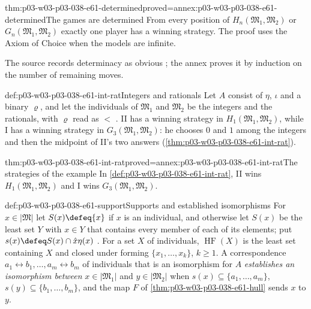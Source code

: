\begin{hblemma}{thm:p03-w03-p03-038-e61-determined}{proved=annex:p03-w03-p03-038-e61-determined}{The games are determined}
From every position of \(H_n(\mathfrak M_1,\mathfrak M_2)\) or
\(G_n(\mathfrak M_1,\mathfrak M_2)\) exactly one player has a winning
strategy. The proof uses the Axiom of Choice when the models are infinite.
\end{hblemma}

The source records determinacy as obvious \cite[p.~132]{Ehrenfeucht1961}; the
annex proves it by induction on the number of remaining moves.

\begin{hbexample}{def:p03-w03-p03-038-e61-int-rat}{Integers and rationals}
Let \(A\) consist of \(\eta\), \(\iota\) and a binary \(\varrho\), and let
the individuals of \(\mathfrak M_1\) and \(\mathfrak M_2\) be the integers
and the rationals, with \(\varrho\) read as \(<\)
\cite[p.~131]{Ehrenfeucht1961}. II has a winning strategy in
\(H_1(\mathfrak M_1,\mathfrak M_2)\), while I has a winning strategy in
\(G_3(\mathfrak M_1,\mathfrak M_2)\): he chooses \(0\) and \(1\) among the
integers and then the midpoint of II's two answers
(\cref{thm:p03-w03-p03-038-e61-int-rat}).
\end{hbexample}

\begin{hblemma}{thm:p03-w03-p03-038-e61-int-rat}{proved=annex:p03-w03-p03-038-e61-int-rat}{The strategies of the example}
In \cref{def:p03-w03-p03-038-e61-int-rat}, II wins
\(H_1(\mathfrak M_1,\mathfrak M_2)\) and I wins
\(G_3(\mathfrak M_1,\mathfrak M_2)\).
\end{hblemma}

\begin{hbdefinition}{def:p03-w03-p03-038-e61-support}{Supports and established isomorphisms}
For \(x\in|\mathfrak M|\) let \(S(x)\defeq\{x\}\) if \(x\) is an
individual, and otherwise let \(S(x)\) be the least set \(Y\) with
\(x\in Y\) that contains every member of each of its elements; put
\(s(x)\defeq S(x)\cap\hat x\eta(x)\) \cite[p.~132]{Ehrenfeucht1961}. For a
set \(X\) of individuals, \(\operatorname{HF}(X)\) is the least set
containing \(X\) and closed under forming
\(\{x_1,\ldots,x_k\}\), \(k\ge1\). A correspondence
\(a_1\leftrightarrow b_1,\ldots,a_m\leftrightarrow b_m\) of individuals that
is an isomorphism for \(A\) \emph{establishes an isomorphism between}
\(x\in|\mathfrak M_1|\) and \(y\in|\mathfrak M_2|\) when
\(s(x)\subseteq\{a_1,\ldots,a_m\}\), \(s(y)\subseteq\{b_1,\ldots,b_m\}\),
and the map \(F\) of \cref{thm:p03-w03-p03-038-e61-hull} sends \(x\) to
\(y\).
\end{hbdefinition}

